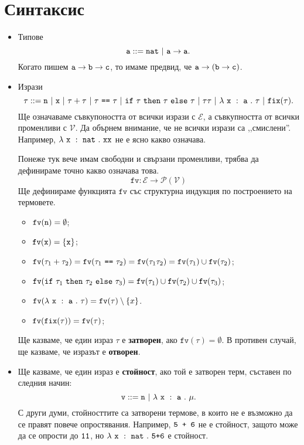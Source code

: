 \section{Синтаксис}

\newcommand{\rename}[2]{\{\vv{#1}/{#2}\}}

\newcommand{\var}{\texttt{var}}
\newcommand{\fv}{\texttt{fv}}

\begin{itemize}
\item{}
  Типове
  \[\vv{a} ::= \vv{nat}\ |\ \vv{a} \to \vv{a}.\]
  Когато пишем 
  $\texttt{a} \to \texttt{b} \to \texttt{c}$, то имаме предвид, че
  $\texttt{a} \to (\texttt{b} \to \texttt{c})$.
\item{}
  Изрази
  \[\tau ::= \vv{n}\ |\ \vv{x}\ |\ \tau + \tau\ |\ \tau\ \vv{==}\ \tau\ |\ \ifelse{\tau}{\tau}{\tau}\ |\ \tau\tau\ |\ \lamb{x}{a}{\tau}\ |\ \fix(\tau).\]
  Ще означаваме съвкупоността от всички изрази с $\mathcal{E}$, а съвкупността от всички променливи с $\mathcal{V}$.
  Да обърнем внимание, че не всички изрази са ,,смислени''. Например,
  $\lambda~\texttt{x}~:~\texttt{nat}~.~{\texttt{xx}}$ не е ясно какво означава.
  
  Понеже тук вече имам свободни и свързани променливи, трябва да дефинираме точно какво означава това.
  \[\fv:\mathcal{E} \to \mathcal{P}(\mathcal{V})\]
  Ще дефинираме функцията $\texttt{fv}$ със структурна индукция по построението на термовете.
  
  \begin{itemize}
  \item
    $\fv(\vv{n}) = \emptyset$;
  \item
    $\fv(\vv{x}) = \{\vv{x}\}$;
  \item
    $\fv(\tau_1 + \tau_2) = \fv(\tau_1\ \vv{==}\ \tau_2) = \fv(\tau_1\tau_2) = \fv(\tau_1) \cup \fv(\tau_2)$;
  \item
    $\fv(\ifelse{\tau_1}{\tau_2}{\tau_3}) = \fv(\tau_1) \cup \fv(\tau_2) \cup \fv(\tau_3)$;
  \item
    $\fv(\lamb{x}{a}{\tau}) = \fv(\tau) \setminus \{x\}$.
  \item
    $\fv(\fix(\tau)) = \fv(\tau)$;
  \end{itemize}
  
  Ще казваме, че един израз $\tau$ е {\bf затворен}, ако $\fv(\tau) = \emptyset$.
  В противен случай, ще казваме, че изразът е {\bf отворен}.
\item
  Ще казваме, че един израз е {\bf стойност}, ако той е затворен терм, съставен по следния начин:
  \[\texttt{v} ::= \texttt{n}\ |\ \lambda~\texttt{x}~:~\texttt{a}~.~{\mu}.\]
  С други думи, стойносттите са затворени термове, в които не е възможно да се правят повече опростявания.
  Например, $\texttt{5 + 6}$ не е стойност, защото може да се опрости до $\texttt{11}$,
  но $\lambda~\texttt{x}~:~\texttt{nat}~.~{\texttt{5+6}}$ е стойност.
\end{itemize}


